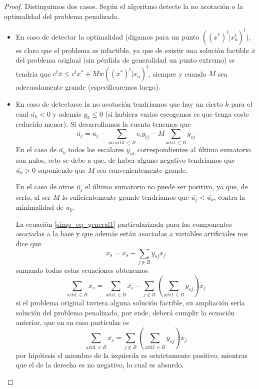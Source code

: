 \begin{proof}
	Distinguimos dos casos. Según el algoritmo detecte la no acotación o la optimalidad del problema penalizado.
	\begin{itemize}
		\item En caso de detectar la optimalidad (digamos para un punto $((x^*)^t|x_a^t)^t$), es claro que el problema es infactible, ya que de existir una solución factible $\overline{x}$ del problema original (sin pérdida de generalidad un punto extremo) se tendría que $c^t\overline{x}\leq c^tx^*+Mw((x^*)^t|x_a)^t$, siempre y cuando $M$ sea adecuadamente grande (especificaremos luego).
		\item En caso de detectarse la no acotación tendríamos que hay un cierto $k$ para el cual $\overline{u_k}<0$ y además $y_k\leq 0$ (si hubiera varios escogemos es que tenga coste reducido menor). Si desarrollamos la cuenta tenemos que 
		\begin{equation*}
			\overline{u_j}=u_j-\sum_{\text{no artif.}\in B}c_iy_{ij}-M\sum_{\text{artif.}\in B}y_{sj}
		\end{equation*}
		En el caso de $\overline{u_k}$ todos los escalares $y_{sk}$ correspondientes al último sumatorio son nulos, esto se debe a que, de haber alguno negativo tendríamos que $\overline{u_k}>0$ suponiendo que $M$ sea convenientemente grande.
		
		En el caso de otros $\overline{u_j}$ el último sumatorio no puede ser positivo, ya que, de serlo, al ser $M$ lo suficientemente grande tendríamos que $\overline{u_j}<\overline{u_k}$, contra la minimalidad de $\overline{u_k}$.
		
		La ecuación \eqref{simp_eq_general1} particularizada para las componentes asociadas a la base y que además están asociadas a variables artificiales nos dice que
		\begin{equation*}
			x_s=\overline{x_s}-\sum_{j\not\in B}y_{sj}x_j
		\end{equation*}
		sumando todas estas ecuaciones obtenemos
		\begin{equation*}
			\sum_{\text{artif.}\in B}x_s=\sum_{\text{artif.}\in B}\overline{x_s}-\sum_{j\not\in B}\left(\sum_{\text{artif.}\in B}y_{sj}\right)x_j
		\end{equation*}
		si el problema original tuviera alguna solución factible, su ampliación sería solución del problema penalizado, por ende, deberá cumplir la ecuación anterior, que en su caso particular es
		\begin{equation*}
			\sum_{\text{artif.}\in B}\overline{x_s}=\sum_{j\not\in B}\left(\sum_{\text{artif.}\in B}y_{sj}\right)x_j
		\end{equation*}
		por hipótesis el miembro de la izquierda es estrictamente positivo, mientras que el de la derecha es no negativo, lo cual es absurdo.  
		\qedhere
	\end{itemize}
\end{proof}
